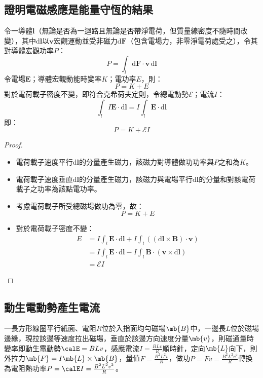 \documentclass[a4paper,12pt]{report}
\begin{document}
\begin{itemize}
\subsection{證明電磁感應是能量守恆的結果}
令一導體$\mathbf{l}$（無論是否為一迴路且無論是否帶淨電荷，但質量線密度不隨時間改變），其中$\mathrm{d}\mathbf{l}$以$\mathbf{v}$宏觀運動並受非磁力$\mathrm{d}\mathbf{F}$（包含電場力，非零淨電荷處受之），令其對導體宏觀功率$P$：
\[P=\int_l\mathrm{d}\mathbf{F}\cdot\mathbf{v}\,\mathrm{d}\mathbf{l}\]
令電場$\mathbf{E}$；導體宏觀動能時變率$K$；電功率$E$，則：
\[P=K+E\]
對於電荷載子密度不變，即符合克希荷夫定則，令總電動勢$\mathcal{E}$；電流$I$：
\[\int_lI\mathbf{E}\cdot\mathrm{d}\mathbf{l}=I\int_l\mathbf{E}\cdot\mathrm{d}\mathbf{l}\]
即：
\[P=K+\mathcal{E}I\]
\begin{proof}
\begin{itemize}
\item 電荷載子速度平行$\mathrm{d}\mathbf{l}$的分量產生磁力，該磁力對導體做功功率與$P$之和為$K$。
\item 電荷載子速度垂直$\mathrm{d}\mathbf{l}$的分量產生磁力，該磁力與電場平行$\mathrm{d}\mathbf{l}$的分量和對該電荷載子之功率為該點電功率。
\item 考慮電荷載子所受總磁場做功為零，故：
\[P=K+E\]
\item 對於電荷載子密度不變：
\[\begin{aligned}
E&=I\int_l\mathbf{E}\cdot\mathrm{d}\mathbf{l}+I\int_l((\mathrm{d}\mathbf{l}\times\mathbf{B})\cdot\mathbf{v})\\
&=I\int_l\mathbf{E}\cdot\mathrm{d}\mathbf{l}-I\int_l\mathbf{B}\cdot(\mathbf{v}\times\mathrm{d}\mathbf{l})\\
&=\mathcal{E}I
\end{aligned}\]
\end{itemize}
\end{proof}
\subsection{動生電動勢產生電流}
一長方形線圈平行紙面、電阻$R$位於入指面均勻磁場$\mb{B}$中，一邊長$L$位於磁場邊緣，現拉該邊等速度拉出磁場，垂直於該邊方向速度分量$\mb{v}$，則磁通量時變率即動生電動勢$\calE=BLv$，感應電流$I=\frac{BLv}{R}$順時針，定向$\mb{L}$向下，則外拉力$\mb{F}=I\mb{L}\times\mb{B}$，量值$F=\frac{B^2L^2v}{R}$，做功$P=Fv=\frac{B^2L^2v^2}{R}$轉換為電阻熱功率$P=\calE I=\frac{B^2L^2v^2}{R}$。

\end{itemize}
\end{document}
